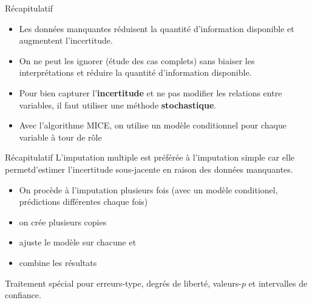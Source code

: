 \documentclass[
  ignorenonframetext,
]{beamer}
\providecommand{\tightlist}{%
  \setlength{\itemsep}{0pt}\setlength{\parskip}{0pt}}\usepackage{longtable,booktabs,array}
\begin{document}
\begin{frame}{Récapitulatif}
\protect\hypertarget{ruxe9capitulatif}{}
\begin{itemize}
\tightlist
\item
  Les données manquantes réduisent la quantité d'information disponible
  et augmentent l'incertitude.
\item
  On ne peut les ignorer (étude des cas complets) sans biaiser les
  interprétations et réduire la quantité d'information disponible.
\item
  Pour bien capturer l'\textbf{incertitude} et ne pas modifier les
  relations entre variables, il faut utiliser une méthode
  \textbf{stochastique}.
\item
  Avec l'algorithme MICE, on utilise un modèle conditionnel pour chaque
  variable à tour de rôle
\end{itemize}
\end{frame}

\begin{frame}{Récapitulatif}
\protect\hypertarget{ruxe9capitulatif-1}{}
L'imputation multiple est préférée à l'imputation simple car elle
permetd'estimer l'incertitude sous-jacente en raison des données
manquantes.

\begin{itemize}
\tightlist
\item
  On procède à l'imputation plusieurs fois (avec un modèle conditionel,
  prédictions différentes chaque fois)
\item
  on crée plusieurs copies
\item
  ajuste le modèle sur chacune et
\item
  combine les résultats
\end{itemize}

Traitement spécial pour erreurs-type, degrés de liberté, valeurs-\(p\)
et intervalles de confiance.
\end{frame}
\end{document}
